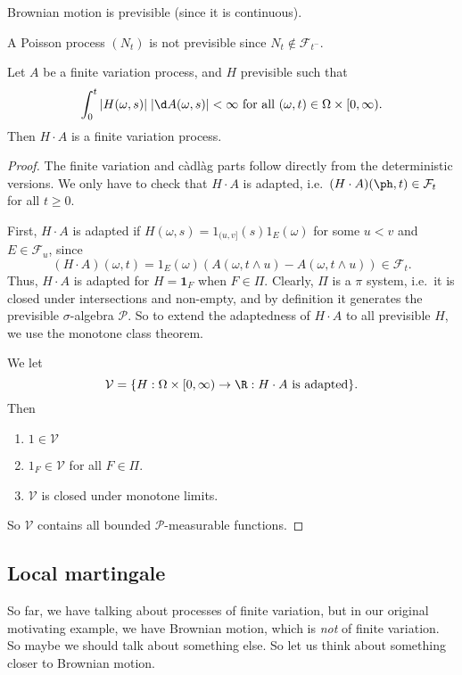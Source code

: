 \documentclass[a4paper]{article}
\begin{document}
\begin{eg}
  Brownian motion is previsible (since it is continuous).
\end{eg}

\begin{eg}
  A Poisson process $(N_t)$ is not previsible since $N_t \not \in \mathcal{F}_{t^-}$.
\end{eg}

\begin{prop}
  Let $A$ be a finite variation process, and $H$ previsible such that
  \[
    \int_0^t |H(\omega, s)|\;|\d A(\omega, s)| < \infty\text{ for all }(\omega, t) \in \Omega \times [0, \infty).
  \]
  Then $H \cdot A$ is a finite variation process.
\end{prop}

\begin{proof}
  The finite variation and c\`adl\`ag parts follow directly from the deterministic versions. We only have to check that $H \cdot A$ is adapted, i.e.\ $(H \cdot A)(\ph, t) \in \mathcal{F}_t$ for all $t \geq 0$.

  First, $H \cdot A$ is adapted if $H(\omega, s) = 1_{(u, v]}(s) 1_E(\omega)$ for some $u < v$ and $E \in \mathcal{F}_u$, since
  \[
    (H \cdot A)(\omega, t) = 1_E(\omega) (A(\omega, t \wedge u) - A(\omega, t \wedge u)) \in \mathcal{F}_t.
  \]
  Thus, $H \cdot A$ is adapted for $H = \mathbf{1}_F$ when $F \in \Pi$. Clearly, $\Pi$ is a $\pi$ system, i.e.\ it is closed under intersections and non-empty, and by definition it generates the previsible $\sigma$-algebra $\mathcal{P}$. So to extend the adaptedness of $H \cdot A$ to all previsible $H$, we use the monotone class theorem.

  We let
  \[
    \mathcal{V} = \{H: \Omega \times [0, \infty) \to \R: H \cdot A\text{ is adapted}\}.
  \]
  Then
  \begin{enumerate}
    \item $1 \in \mathcal{V}$
    \item $1_F \in \mathcal{V}$ for all $F \in \Pi$.
    \item $\mathcal{V}$ is closed under monotone limits.
  \end{enumerate}
  So $\mathcal{V}$ contains all bounded $\mathcal{P}$-measurable functions.
\end{proof}

\subsection{Local martingale}
So far, we have talking about processes of finite variation, but in our original motivating example, we have Brownian motion, which is \emph{not} of finite variation. So maybe we should talk about something else. So let us think about something closer to Brownian motion.
\end{document}
